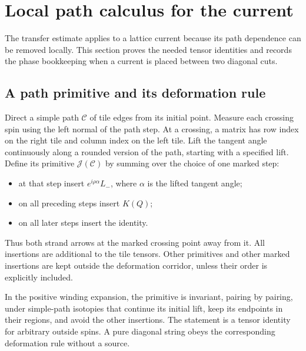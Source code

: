 \section{Local path calculus for the current}\label{sec:current}

The transfer estimate applies to a lattice current because its
path dependence can be removed locally. This section proves the
needed tensor identities and records the phase bookkeeping when
a current is placed between two diagonal cuts.

\subsection{A path primitive and its deformation rule}

Direct a simple path $\mathcal C$ of tile edges from its initial
point. Measure each crossing spin using the left normal of the
path step. At a crossing, a matrix has row index on the right tile
and column index on the left tile. Lift the tangent angle
continuously along a rounded version of the path, starting with a
specified lift. Define its primitive $\mathcal J(\mathcal C)$ by
summing over the choice of one marked step:
\begin{itemize}
\item at that step insert $e^{i\rho\alpha}L_-$, where $\alpha$
      is the lifted tangent angle;
\item on all preceding steps insert $K(Q)$;
\item on all later steps insert the identity.
\end{itemize}
Thus both strand arrows at the marked crossing point away from it.
All insertions are additional to the tile tensors. Other primitives
and other marked insertions are kept outside the deformation
corridor, unless their order is explicitly included.

\begin{lemma}\label{cur:deformation}
In the positive winding expansion, the primitive is invariant,
pairing by pairing, under simple-path isotopies that continue its
initial lift, keep its endpoints in their regions, and avoid the
other insertions. The statement is a tensor identity for arbitrary
outside spins. A pure diagonal string obeys the corresponding
deformation rule without a source.
\end{lemma}

